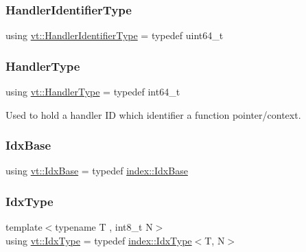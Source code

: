 \subsubsection{\texorpdfstring{Handler\+Identifier\+Type}{HandlerIdentifierType}}
{\footnotesize\ttfamily using \hyperlink{namespacevt_a59ae068fe828d1c33051ff96f3d016b6}{vt\+::\+Handler\+Identifier\+Type} = typedef uint64\+\_\+t}

\mbox{\label{namespacevt_af64846b57dfcaf104da3ef6967917573}} 
\subsubsection{\texorpdfstring{Handler\+Type}{HandlerType}}
{\footnotesize\ttfamily using \hyperlink{namespacevt_af64846b57dfcaf104da3ef6967917573}{vt\+::\+Handler\+Type} = typedef int64\+\_\+t}



Used to hold a handler ID which identifier a function pointer/context. 

\mbox{\label{namespacevt_afb96657e28fa98eb685c5e0c6b1b122e}} 
\subsubsection{\texorpdfstring{Idx\+Base}{IdxBase}}
{\footnotesize\ttfamily using \hyperlink{namespacevt_afb96657e28fa98eb685c5e0c6b1b122e}{vt\+::\+Idx\+Base} = typedef \hyperlink{namespacevt_1_1index_a0dbb8d47463da27c1436e8e4ddb02743}{index\+::\+Idx\+Base}}

\mbox{\label{namespacevt_a906c25b521ff516f5e8ba6d96fe2d424}} 
\subsubsection{\texorpdfstring{Idx\+Type}{IdxType}}
{\footnotesize\ttfamily template$<$typename T , int8\+\_\+t N$>$ \\
using \hyperlink{namespacevt_a906c25b521ff516f5e8ba6d96fe2d424}{vt\+::\+Idx\+Type} = typedef \hyperlink{namespacevt_1_1index_a939bace7aba6cd4a76b2c12a138c5991}{index\+::\+Idx\+Type}$<$T, N$>$}

